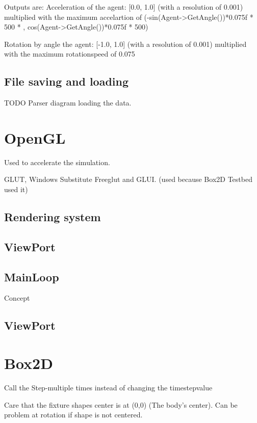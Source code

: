 \documentclass[10pt,a4paper,DIV=11]{scrreprt}
\begin{document}
Outputs are:
Acceleration of the agent: [0.0, 1.0] (with a resolution of 0.001)
multiplied with the maximum accelartion of 
(-sin(Agent->GetAngle())*0.075f * 500 * ,  cos(Agent->GetAngle())*0.075f * 500)

Rotation by angle the agent: [-1.0, 1.0] (with a resolution of 0.001)
multiplied with the maximum rotationspeed of 0.075


\subsection{File saving and loading}

TODO Parser diagram loading the data.


\section{OpenGL}
Used to accelerate the simulation.


GLUT, Windows Substitute Freeglut and GLUI. (used because Box2D Testbed used it)

\subsection{Rendering system}

\subsection{ViewPort}

\subsection{MainLoop}

Concept

\subsection{ViewPort}

\section{Box2D}

Call the Step-multiple times instead of changing the timestepvalue

Care that the fixture shapes center is at (0,0) (The body's center). Can be problem at rotation if shape is not centered.
\end{document}
